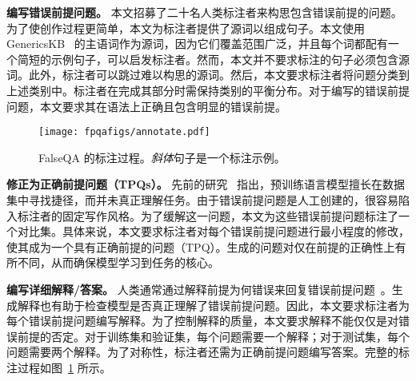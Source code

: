 \textbf{编写错误前提问题。} 本文招募了二十名人类标注者来构思包含错误前提的问题。为了使创作过程更简单，本文为标注者提供了源词以组成句子。本文使用 GenericsKB~\cite{bhakthavatsalam2020genericskb} 的主语词作为源词，因为它们覆盖范围广泛，并且每个词都配有一个简短的示例句子，可以启发标注者。然而，本文并不要求标注的句子必须包含源词。此外，标注者可以跳过难以构思的源词。然后，本文要求标注者将问题分类到上述类别中。标注者在完成其部分时需保持类别的平衡分布。对于编写的错误前提问题，本文要求其在语法上正确且包含明显的错误前提。



\begin{figure}[!htbp]
    \centering
    \texttt{[image: fpqafigs/annotate.pdf]}
    \caption{FalseQA 的标注过程。\textit{斜体}句子是一个标注示例。}
    \label{fig:annotateprocess}
\end{figure}

\textbf{修正为正确前提问题（TPQs）。} 先前的研究~\cite{du-etal-2021-towards} 指出，预训练语言模型擅长在数据集中寻找捷径，而并未真正理解任务。由于错误前提问题是人工创建的，很容易陷入标注者的固定写作风格。为了缓解这一问题，本文为这些错误前提问题标注了一个对比集。具体来说，本文要求标注者对每个错误前提问题进行最小程度的修改，使其成为一个具有正确前提的问题（TPQ）。生成的问题对仅在前提的正确性上有所不同，从而确保模型学习到任务的核心。

\textbf{编写详细解释/答案。} 人类通常通过解释前提为何错误来回复错误前提问题~\cite{kaplan1978indirect}。生成解释也有助于检查模型是否真正理解了错误前提问题。因此，本文要求标注者为每个错误前提问题编写解释。为了控制解释的质量，本文要求解释不能仅仅是对错误前提的否定。对于训练集和验证集，每个问题需要一个解释；对于测试集，每个问题需要两个解释。为了对称性，标注者还需为正确前提问题编写答案。完整的标注过程如图~\ref{fig:annotateprocess} 所示。

